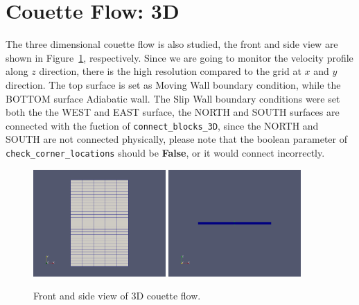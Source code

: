 
\newpage
\section{Couette Flow: 3D}
\label{couette-flow-3D}
%
The three dimensional couette flow is also studied, the front and side view are shown in
Figure~\ref{couette3-frontside-fig}, respectively. Since we are going to monitor the velocity profile along
$z$ direction, there is the high resolution compared to the grid at $x$ and $y$ direction. The top surface
is set as Moving Wall boundary condition, while the BOTTOM surface Adiabatic wall. The Slip Wall boundary
conditions were set both the the WEST and EAST surface, the NORTH and SOUTH surfaces are connected
with the fuction of \texttt{connect\_blocks\_3D}, since the NORTH and SOUTH are not connected
physically, please note that the boolean parameter of \texttt{check\_corner\_locations} should be
\textbf{False}, or it would connect incorrectly.

\begin{figure}[htbp]
\begin{center}
\includegraphics[width=0.45\textwidth]{../3D/couette-flow/front-view.png}
\includegraphics[width=0.45\textwidth]{../3D/couette-flow/side-view.png}
\end{center}
\caption{Front and side view of 3D couette flow.}
   \label{couette3-frontside-fig}
\end{figure}


